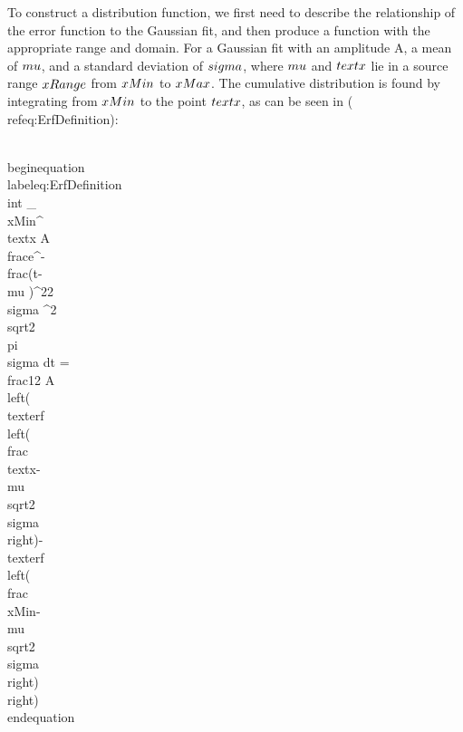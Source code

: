 To construct a distribution function, we first need to describe the relationship of the error function to the Gaussian fit, and then produce a function with the appropriate range and domain. For a Gaussian fit with an amplitude A, a mean of $\\mu$, and a standard deviation of $\\sigma$, where $\\mu$ and $\\text{x}$ lie in a source range $\\xRange$ from $\\xMin$ to $\\xMax$. The cumulative distribution is found by integrating from $\\xMin$ to the point $\\text{x}$, as can be seen in (\\ref{eq:ErfDefinition}):

\\begin{equation}\\label{eq:ErfDefinition}
  \\int _{\\xMin}^{\\text{x}} A \\frac{e^{-\\frac{(t-\\mu )^2}{2 \\sigma ^2}}}{\\sqrt{2 \\pi } \\sigma }dt = 
  \\frac{1}{2} A \\left(\\text{erf}\\left(\\frac{\\text{x}-\\mu }{\\sqrt{2} \\sigma }\\right)-\\text{erf}\\left(\\frac{\\xMin-\\mu }{\\sqrt{2} \\sigma }\\right)\\right)
\\end{equation}

